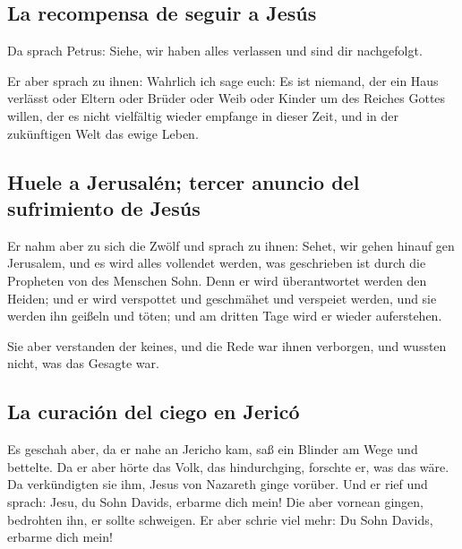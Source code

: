 \hypertarget{la-recompensa-de-seguir-a-jesuxfas}{%
\subsection{La recompensa de seguir a
Jesús}\label{la-recompensa-de-seguir-a-jesuxfas}}

 Da sprach Petrus: Siehe, wir haben alles verlassen und
sind dir nachgefolgt.

 Er aber sprach zu ihnen: Wahrlich ich sage euch: Es ist
niemand, der ein Haus verlässt oder Eltern oder Brüder oder Weib oder
Kinder um des Reiches Gottes willen,  der es nicht
vielfältig wieder empfange in dieser Zeit, und in der zukünftigen Welt
das ewige Leben.

\hypertarget{huele-a-jerusaluxe9n-tercer-anuncio-del-sufrimiento-de-jesuxfas}{%
\subsection{Huele a Jerusalén; tercer anuncio del sufrimiento de
Jesús}\label{huele-a-jerusaluxe9n-tercer-anuncio-del-sufrimiento-de-jesuxfas}}

 Er nahm aber zu sich die Zwölf und sprach zu ihnen:
Sehet, wir gehen hinauf gen Jerusalem, und es wird alles vollendet
werden, was geschrieben ist durch die Propheten von des Menschen Sohn.
 Denn er wird überantwortet werden den Heiden; und er
wird verspottet und geschmähet und verspeiet werden,  und
sie werden ihn geißeln und töten; und am dritten Tage wird er wieder
auferstehen.

 Sie aber verstanden der keines, und die Rede war ihnen
verborgen, und wussten nicht, was das Gesagte war.

\hypertarget{la-curaciuxf3n-del-ciego-en-jericuxf3}{%
\subsection{La curación del ciego en
Jericó}\label{la-curaciuxf3n-del-ciego-en-jericuxf3}}

 Es geschah aber, da er nahe an Jericho kam, saß ein
Blinder am Wege und bettelte.  Da er aber hörte das Volk,
das hindurchging, forschte er, was das wäre.  Da
verkündigten sie ihm, Jesus von Nazareth ginge vorüber. 
Und er rief und sprach: Jesu, du Sohn Davids, erbarme dich mein!
 Die aber vornean gingen, bedrohten ihn, er sollte
schweigen. Er aber schrie viel mehr: Du Sohn Davids, erbarme dich mein!

